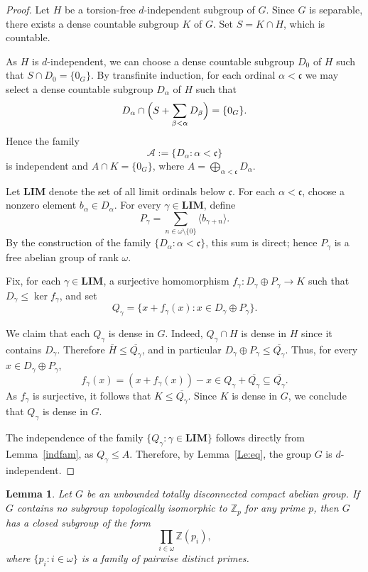 \documentclass[12pt]{amsart}
\newtheorem{lemma}[theorem]{Lemma}
\theoremstyle{definition}
\theoremstyle{remark}
\newcommand{\LIM}{\mathbf{LIM}}
\def\c {{\mathfrak{c}}}
\begin{document}
\begin{proof}
Let $H$ be a torsion-free $d$-independent subgroup of $G$.
Since $G$ is separable, there exists a dense countable subgroup $K$ of $G$.
Set $S=K\cap H$, which is countable.

As $H$ is $d$-independent, we can choose a dense countable subgroup
$D_0$ of $H$ such that $S\cap D_0=\{0_G\}$.
By transfinite induction, for each ordinal $\alpha<\mathfrak{c}$ we may select
a dense countable subgroup $D_\alpha$ of $H$ such that
\[
D_\alpha\cap\Bigl(S+\sum_{\beta<\alpha}D_\beta\Bigr)=\{0_G\}.
\]
Hence the family
\[
\mathcal{A}:=\{D_\alpha:\alpha<\mathfrak{c}\}
\]
is independent and $A\cap K=\{0_G\}$, where $A=\bigoplus_{\alpha<\c} D_\alpha$.

Let $\mathbf{LIM}$ denote the set of all limit ordinals below $\mathfrak{c}$.
For each $\alpha<\mathfrak{c}$, choose a nonzero element
$b_\alpha\in D_\alpha$.
For every $\gamma\in\mathbf{LIM}$, define
\[
P_\gamma=\sum_{n\in\omega\setminus\{0\}}\langle b_{\gamma+n}\rangle.
\]
%
By the construction of the family $\{D_\alpha:\alpha<\mathfrak{c}\}$, this sum
is direct; hence $P_\gamma$ is a free abelian group of rank $\omega$.

Fix, for each $\gamma\in\mathbf{LIM}$, a surjective homomorphism
$f_\gamma\colon D_\gamma\oplus P_\gamma\to K$ such that
$D_\gamma\leq\ker f_\gamma$, and set
\[
Q_\gamma=\{x+f_\gamma(x):x\in D_\gamma\oplus P_\gamma\}.
\]

We claim that each $Q_\gamma$ is dense in $G$.
Indeed, $Q_\gamma\cap H$ is dense in $H$ since it contains $D_\gamma$.
Therefore $\overline{H}\leq\overline{Q_\gamma}$, and in particular
$D_\gamma\oplus P_\gamma\leq\overline{Q_\gamma}$.
Thus, for every $x\in D_\gamma\oplus P_\gamma$,
\[
f_\gamma(x)=(x+f_\gamma(x))-x\in Q_\gamma+\overline{Q_\gamma}
\subseteq\overline{Q_\gamma}.
\]
As $f_\gamma$ is surjective, it follows that $K\leq\overline{Q_\gamma}$.
Since $K$ is dense in $G$, we conclude that $Q_\gamma$ is dense in $G$.

The independence of the family
$\{Q_\gamma: \gamma\in \LIM\}$
follows directly from Lemma~\ref{indfam}, as $Q_\gamma\leq A$.
Therefore, by Lemma~\ref{Le:eq}, the group $G$ is $d$-independent.
\end{proof}



\begin{lemma}\label{infip}
Let $G$ be an unbounded totally disconnected compact abelian group.
If $G$ contains no subgroup topologically isomorphic to $\mathbb{Z}_p$ for any prime $p$,
then $G$ has a closed subgroup of the form
\[
\prod_{i\in \omega} \mathbb{Z}(p_i),
\]
where $\{p_i : i\in \omega\}$ is a family of pairwise distinct primes.
\end{lemma}
\end{document}
